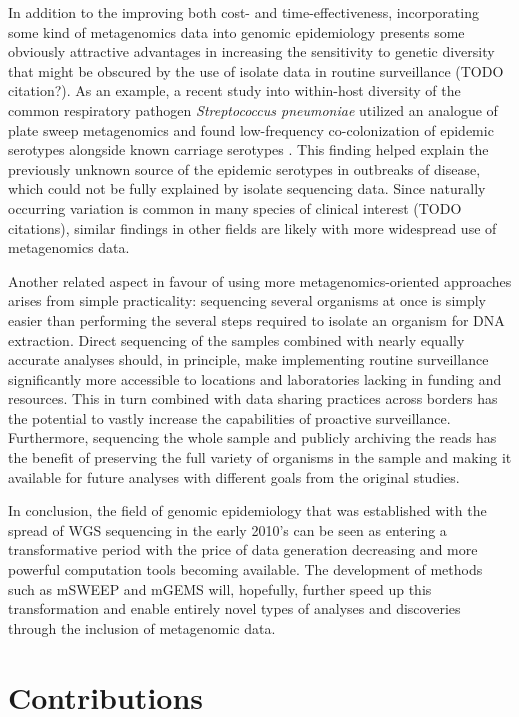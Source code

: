 \documentclass[officiallayout]{tktla}
\begin{document}
In addition to the improving both cost- and time-effectiveness,
incorporating some kind of metagenomics data into genomic epidemiology
presents some obviously attractive advantages in increasing the
sensitivity to genetic diversity that might be obscured by the use of
isolate data in routine surveillance (TODO citation?). As an example,
a recent study into within-host diversity of the common respiratory
pathogen \textit{Streptococcus pneumoniae} utilized an analogue of
plate sweep metagenomics and found low-frequency co-colonization of
epidemic serotypes alongside known carriage serotypes
\citep{tonkin-hill_pneumococcal_2022}. This finding helped explain the
previously unknown source of the epidemic serotypes in outbreaks of
disease, which could not be fully explained by isolate sequencing
data. Since naturally occurring variation is common in many species of
clinical interest (TODO citations), similar findings in other fields
are likely with more widespread use of metagenomics data.

Another related aspect in favour of using more metagenomics-oriented
approaches arises from simple practicality: sequencing several
organisms at once is simply easier than performing the several steps
required to isolate an organism for DNA extraction. Direct sequencing
of the samples combined with nearly equally accurate analyses should,
in principle, make implementing routine surveillance significantly
more accessible to locations and laboratories lacking in funding and
resources. This in turn combined with data sharing practices across
borders has the potential to vastly increase the capabilities of
proactive surveillance. Furthermore, sequencing the whole sample and
publicly archiving the reads has the benefit of preserving the full
variety of organisms in the sample and making it available for future
analyses with different goals from the original studies.

In conclusion, the field of genomic epidemiology that was established
with the spread of WGS sequencing in the early 2010's can be seen as
entering a transformative period with the price of data generation
decreasing and more powerful computation tools becoming available. The
development of methods such as mSWEEP and mGEMS will, hopefully,
further speed up this transformation and enable entirely novel types
of analyses and discoveries through the inclusion of metagenomic data.

\section{Contributions}
\end{document}
